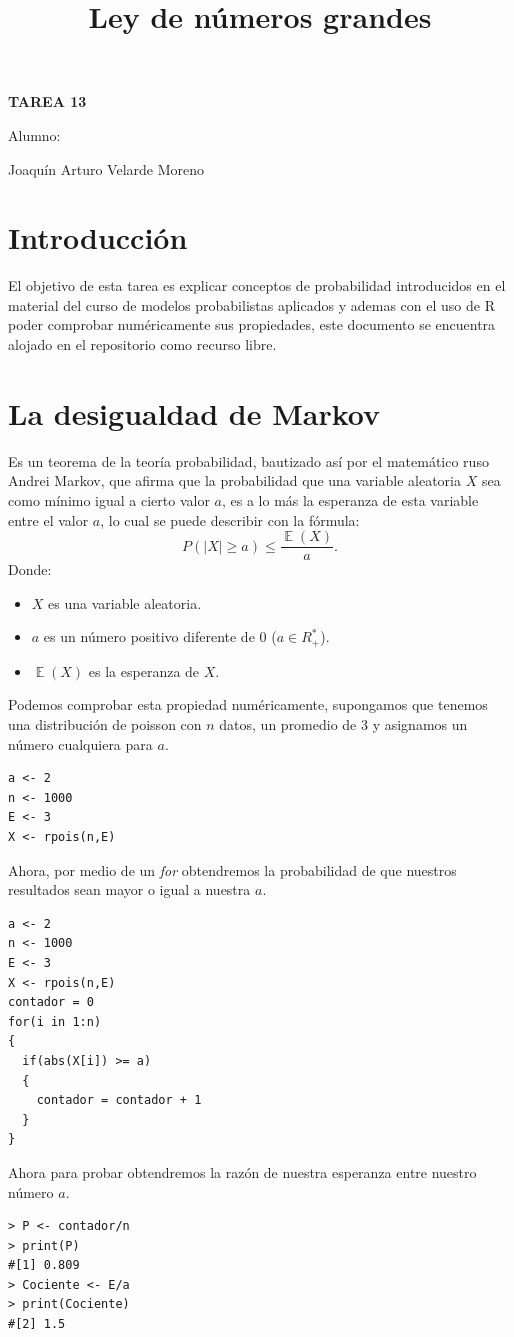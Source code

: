 \documentclass[]{article}
\title{Ley de números grandes}
\date{}
\DeclareMathOperator{\EX}{\mathbb{E}}%
\begin{document}
	\maketitle
	\begin{center}


\centerline{\textbf{TAREA 13} } 
\textbf{ }

\centerline{Alumno: } 
\centerline{Joaquín Arturo Velarde Moreno}


	\end{center}
	

\section{Introducción}

El objetivo de esta tarea es explicar conceptos de probabilidad introducidos en el material del curso de modelos probabilistas aplicados\cite{MaterialClase} y ademas con el uso de R poder comprobar numéricamente sus propiedades\cite{rproject}, este documento se encuentra alojado en el repositorio\cite{repositorio} como recurso libre.

\section{La desigualdad de Markov}


Es un teorema de la teoría probabilidad, bautizado así por el matemático ruso Andrei Markov, que afirma que la probabilidad que una variable aleatoria $X$ sea como mínimo igual a cierto valor $a$, es a lo más la esperanza de esta variable entre el valor $a$, lo cual se puede describir con la fórmula:
\[ P(\lvert X \lvert \geq a) \leq \frac{\EX(X)}{a}.  \]
Donde:
\begin{itemize}
	\item $X$ es una variable aleatoria.
	\item $a$ es un número positivo diferente de 0 ($a \in R_{+}^{*}$).
	\item $\EX(X)$ es la esperanza de $X$.
\end{itemize}

Podemos comprobar esta propiedad numéricamente, supongamos que tenemos una distribución de poisson con $n$ datos, un promedio de 3 y asignamos un número cualquiera para $a$.
  \begin{lstlisting}
a <- 2
n <- 1000
E <- 3
X <- rpois(n,E)
   \end{lstlisting}
Ahora, por medio de un \textit{for} obtendremos la probabilidad de que nuestros resultados sean mayor o igual a nuestra $a$.
  \begin{lstlisting}
a <- 2
n <- 1000
E <- 3
X <- rpois(n,E)
contador = 0
for(i in 1:n)
{
  if(abs(X[i]) >= a)
  {
    contador = contador + 1
  }
}
   \end{lstlisting}
Ahora para probar obtendremos la razón de nuestra esperanza entre nuestro número $a$.
  \begin{lstlisting}
> P <- contador/n
> print(P)
#[1] 0.809
> Cociente <- E/a
> print(Cociente)
#[2] 1.5
   \end{lstlisting}
\end{document}

